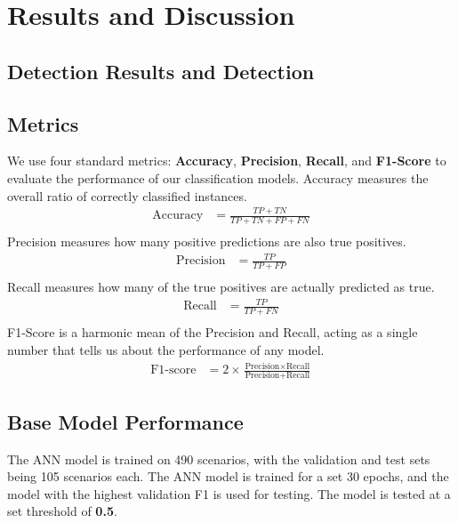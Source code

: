 \documentclass[final,5p,times,twocolumn,authoryear]{elsarticle}
\begin{document}
\section{Results and Discussion}

\subsection{Detection Results and Detection}

\subsection{Metrics}

We use four standard metrics: \textbf{Accuracy}, \textbf{Precision}, \textbf{Recall}, and \textbf{F1-Score} to evaluate the performance of our classification models.
\vspace{0.1cm}
\newline Accuracy measures the overall ratio of correctly classified instances.
\begin{align}
    \text{Accuracy} &= \frac{TP + TN}{TP + TN + FP + FN} \\[6pt]
\end{align}
\newline Precision measures how many positive predictions are also true positives.
\begin{align}
    \text{Precision} &= \frac{TP}{TP + FP} \\[6pt]
\end{align}
\newline Recall measures how many of the true positives are actually predicted as true.
\begin{align}
    \text{Recall} &= \frac{TP}{TP + FN} \\[6pt]
\end{align}
\newline F1-Score is a harmonic mean of the Precision and Recall, acting as a single number that tells us about the performance of any model.
\begin{align}
    \text{F1-score} &= 2 \times \frac{\text{Precision} \times \text{Recall}}{\text{Precision} + \text{Recall}}
\end{align}

\subsection{Base Model Performance}

The ANN model is trained on 490 scenarios, with the validation and test sets being 105 scenarios each. The ANN model is trained for a set 30 epochs, and the model with the highest validation F1 is used for testing. The model is tested at a set threshold of \textbf{0.5}.
\end{document}

